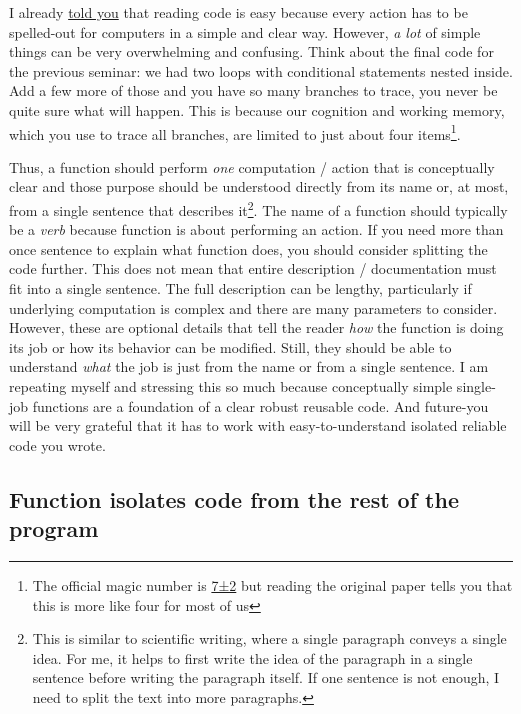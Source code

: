 \documentclass[
]{book}
\begin{document}
I already \protect\hyperlink{programming-tips}{told you} that reading code is easy because every action has to be spelled-out for computers in a simple and clear way. However, \emph{a lot} of simple things can be very overwhelming and confusing. Think about the final code for the previous seminar: we had two loops with conditional statements nested inside. Add a few more of those and you have so many branches to trace, you never be quite sure what will happen. This is because our cognition and working memory, which you use to trace all branches, are limited to just about four items\footnote{The official magic number is \href{https://en.wikipedia.org/wiki/The_Magical_Number_Seven,_Plus_or_Minus_Two}{7±2} but reading the original paper tells you that this is more like four for most of us}.

Thus, a function should perform \emph{one} computation / action that is conceptually clear and those purpose should be understood directly from its name or, at most, from a single sentence that describes it\footnote{This is similar to scientific writing, where a single paragraph conveys a single idea. For me, it helps to first write the idea of the paragraph in a single sentence before writing the paragraph itself. If one sentence is not enough, I need to split the text into more paragraphs.}. The name of a function should typically be a \emph{verb} because function is about performing an action. If you need more than once sentence to explain what function does, you should consider splitting the code further. This does not mean that entire description / documentation must fit into a single sentence. The full description can be lengthy, particularly if underlying computation is complex and there are many parameters to consider. However, these are optional details that tell the reader \emph{how} the function is doing its job or how its behavior can be modified. Still, they should be able to understand \emph{what} the job is just from the name or from a single sentence. I am repeating myself and stressing this so much because conceptually simple single-job functions are a foundation of a clear robust reusable code. And future-you will be very grateful that it has to work with easy-to-understand isolated reliable code you wrote.

\hypertarget{function-isolates-code-from-the-rest-of-the-program}{%
\subsection{Function isolates code from the rest of the program}\label{function-isolates-code-from-the-rest-of-the-program}}
\end{document}
